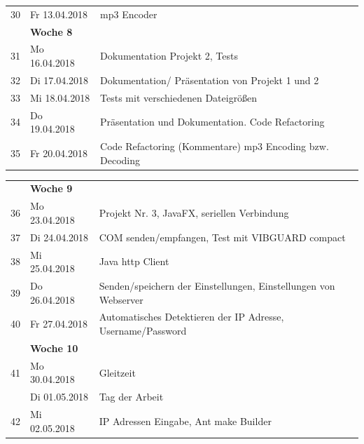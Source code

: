 \documentclass{article}
\begin{document}
{\begin{tabular}{l|p{2.5cm}|p{15cm}}
		30 & Fr 13.04.2018 & 
		mp3 Encoder\\

				

		& \textbf{Woche 8}&\\

		31 & Mo 16.04.2018	  & 
		Dokumentation Projekt 2, Tests\\

		32 & Di 17.04.2018  & 
		Dokumentation/ Präsentation von Projekt 1 und 2\\

		33 & Mi 18.04.2018	 & 
		Tests mit verschiedenen Dateigrößen\\

		34 & Do 19.04.2018 & 
		Präsentation und Dokumentation. Code Refactoring\\

		35 & Fr 20.04.2018 & 
		Code Refactoring (Kommentare) mp3 Encoding bzw. Decoding\\

	
	\end{tabular}
	\begin{tabular}{l|p{2.5cm}|p{15cm}}
		

		& \textbf{Woche 9}&\\

		
		
		36 & Mo 23.04.2018	  & 
		Projekt Nr. 3, JavaFX, seriellen Verbindung\\

		37 & Di 24.04.2018  & 
		COM senden/empfangen, Test mit VIBGUARD compact\\

		38 & Mi 25.04.2018	 & 
		Java http Client\\

		39 & Do 26.04.2018 & 
		Senden/speichern der Einstellungen, Einstellungen von Webserver\\

		40 & Fr 27.04.2018 & 
		Automatisches Detektieren der IP Adresse, Username/Password\\


		& \textbf{Woche 10}&\\

		
		
		41 & Mo 30.04.2018	  & 
		Gleitzeit\\

		 & Di 01.05.2018	  & 
		Tag der Arbeit\\

		42 & Mi 02.05.2018	 & 
		IP Adressen Eingabe, Ant make Builder\\


\end{tabular}}
\end{document}
